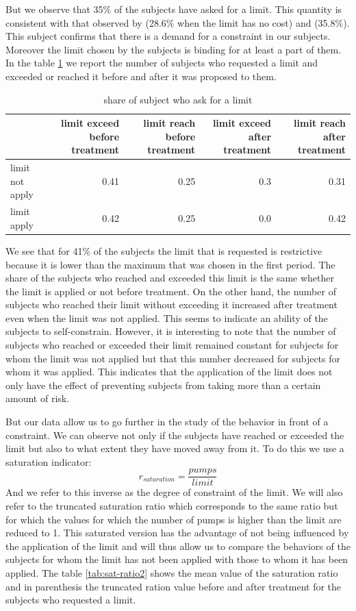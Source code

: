 \documentclass[
]{book}
\begin{document}
But we observe that 35\% of the subjects
have asked for a limit.
This quantity is consistent with that observed by \citet{houser2018temptation} (28.6\%
when the limit has no cost) and \citet{toussaert2018eliciting} (35.8\%).
This subject confirms that there is a demand for a constraint in our subjects.
Moreover the limit chosen by the subjects is binding for at least a part of them.
In the table \ref{tab:limit-ask2} we report the number of subjects who requested a limit and
exceeded or reached it before and after it was proposed to them.

\begin{table}

\caption{\label{tab:limit-ask2}share of subject who ask for a limit}
\centering
\begin{tabular}[t]{l|r|r|r|r}
\hline
 & limit exceed before treatment & limit reach before treatment & limit exceed after treatment & limit reach after treatment\\
\hline
limit not apply & 0.41 & 0.25 & 0.3 & 0.31\\
\hline
limit apply & 0.42 & 0.25 & 0.0 & 0.42\\
\hline
\end{tabular}
\end{table}

We see that for 41\% of the subjects the limit that is requested is restrictive
because it is lower than the maximum that was chosen in the first period.
The share of the subjects who reached and exceeded this limit is the same
whether the limit is applied or not before treatment.
On the other hand, the number of subjects who reached their limit without
exceeding it increased after treatment even when the limit was not applied.
This seems to indicate an ability of the subjects to self-constrain.
However, it is interesting to note that the number of subjects who reached or
exceeded their limit remained constant for subjects for whom the limit was not
applied but that this number decreased for subjects for whom it was applied.
This indicates that the application of the limit does not only have the effect
of preventing subjects from taking more than a certain amount of risk.

But our data allow us to go further in the study of the behavior in front of a
constraint.
We can observe not only if the subjects have reached or exceeded the limit but
also to what extent they have moved away from it.
To do this we use a saturation indicator:
\[
r_{saturation} = \frac{pumps}{limit}
\]
And we refer to this inverse as the degree of constraint of the limit.
We will also refer to the truncated saturation ratio which corresponds to the
same ratio but for which the values for which the number of pumps is higher than
the limit are reduced to 1.
This saturated version has the advantage of not being influenced by the
application of the limit and will thus allow us to compare the behaviors of the
subjects for whom the limit has not been applied with those to whom it has been
applied.
The table \ref{tab:sat-ratio2} shows the mean value of the saturation ratio and in parenthesis
the truncated ration value before and after treatment for the subjects who
requested a limit.
\end{document}
